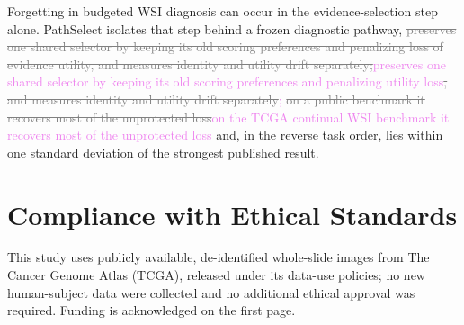 \documentclass{article}
\newif\ifmarkup \markuptrue
\newcommand{\repc}[3]{\ifmarkup\textcolor{gray}{\sout{#2}}\textcolor{#1}{#3}\else#3\fi}
\newcommand{\repP}[2]{\repc{violet}{#1}{#2}}  %
\newcommand{\delB}[1]{\ifmarkup\textcolor{gray}{\sout{#1}}\fi}
\begin{document}
Forgetting in budgeted WSI diagnosis can occur in the evidence-selection step alone. PathSelect isolates that step behind a frozen diagnostic pathway, \repP{preserves one shared selector by keeping its old scoring preferences and penalizing loss of evidence utility, and measures identity and utility drift separately;}{preserves one shared selector by keeping its old scoring preferences and penalizing utility loss\delB{, and measures identity and utility drift separately};} \repP{on a public benchmark it recovers most of the unprotected loss}{on the TCGA continual WSI benchmark it recovers most of the unprotected loss} and, in the reverse task order, lies within one standard deviation of the strongest published result.




\section*{Compliance with Ethical Standards}
This study uses publicly available, de-identified whole-slide images from The Cancer Genome Atlas (TCGA), released under its data-use policies; no new human-subject data were collected and no additional ethical approval was required. Funding is acknowledged on the first page.
\end{document}
